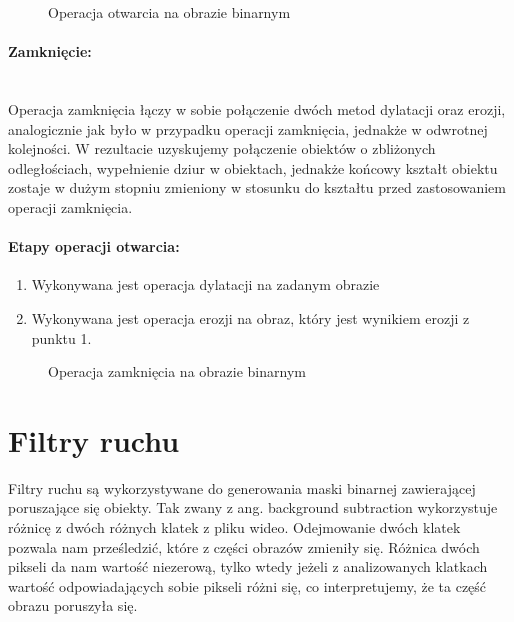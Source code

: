 \documentclass[a4paper,12pt,twoside,openany]{report}
\newcommand{\ImgPath}{.}
\begin{document}
\begin{figure}[H]
	\centering
	\caption{Operacja otwarcia na obrazie binarnym}
\end{figure}

\paragraph{Zamknięcie:}\mbox{} \\
Operacja zamknięcia łączy w sobie połączenie dwóch metod dylatacji oraz erozji, analogicznie jak było w przypadku operacji zamknięcia, jednakże w odwrotnej kolejności. W rezultacie uzyskujemy połączenie obiektów o zbliżonych odległościach, wypełnienie dziur w obiektach, jednakże końcowy kształt obiektu zostaje w dużym stopniu zmieniony w stosunku do kształtu przed zastosowaniem operacji zamknięcia.

\paragraph{Etapy operacji otwarcia:}
\begin{enumerate}
	\item Wykonywana jest operacja dylatacji na zadanym obrazie
	\item Wykonywana jest operacja erozji na obraz, który jest wynikiem erozji z punktu 1.
\end{enumerate}

\begin{figure}[H]
	\centering
	\caption{Operacja zamknięcia na obrazie binarnym}
\end{figure}

\section{Filtry ruchu}
Filtry ruchu są wykorzystywane do generowania maski binarnej zawierającej poruszające się obiekty. Tak zwany z ang. background subtraction wykorzystuje różnicę z dwóch różnych klatek z pliku wideo. Odejmowanie dwóch klatek pozwala nam prześledzić, które z części obrazów zmieniły się. Różnica dwóch pikseli da nam wartość niezerową, tylko wtedy jeżeli z analizowanych klatkach wartość odpowiadających sobie pikseli różni się, co interpretujemy, że ta część obrazu poruszyła się. 
\end{document}
